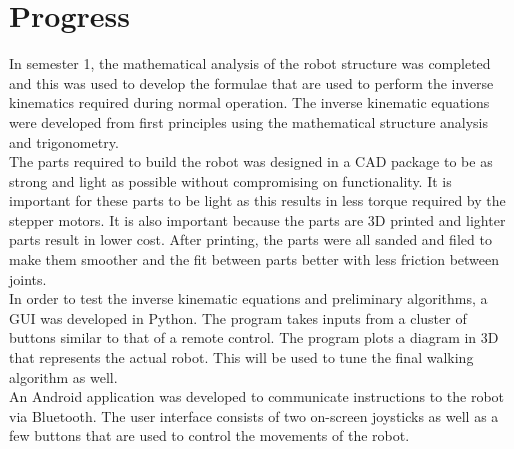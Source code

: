 
\section{Progress}

In semester 1, the mathematical analysis of the robot structure was completed and this was used to develop the formulae that are used to perform the inverse kinematics required during normal operation. The inverse kinematic equations were developed from first principles using the mathematical structure analysis and trigonometry.\\

The parts required to build the robot was designed in a CAD package to be as strong and light as possible without compromising on functionality. It is important for these parts to be light as this results in less torque required by the stepper motors. It is also important because the parts are 3D printed and lighter parts result in lower cost. After printing, the parts were all sanded and filed to make them smoother and the fit between parts better with less friction between joints.\\

In order to test the inverse kinematic equations and preliminary algorithms, a GUI was developed in Python. The program takes inputs from a cluster of buttons similar to that of a remote control. The program plots a diagram in 3D that represents the actual robot. This will be used to tune the final walking algorithm as well.\\

An Android application was developed to communicate instructions to the robot via Bluetooth. The user interface consists of two on-screen joysticks as well as a few buttons that are used to control the movements of the robot.\\

\newpage




